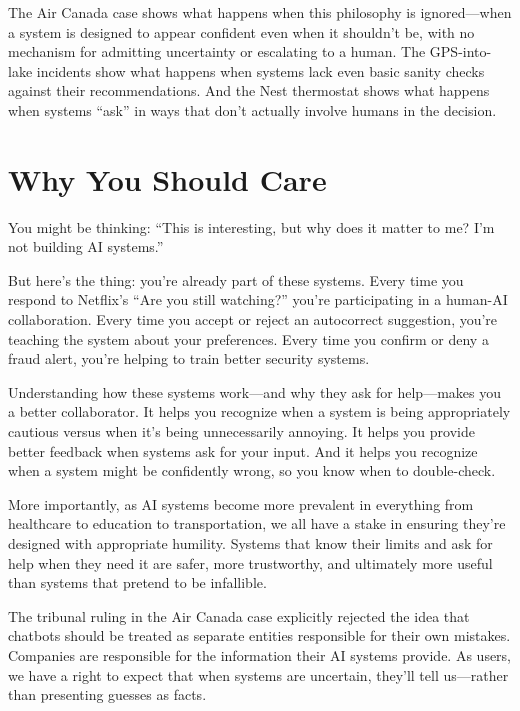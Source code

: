 The Air Canada case shows what happens when this philosophy is ignored---when a system is designed to appear confident even when it shouldn't be, with no mechanism for admitting uncertainty or escalating to a human. The GPS-into-lake incidents show what happens when systems lack even basic sanity checks against their recommendations. And the Nest thermostat shows what happens when systems ``ask'' in ways that don't actually involve humans in the decision.

\section{Why You Should Care}

You might be thinking: ``This is interesting, but why does it matter to me? I'm not building AI systems.''

But here's the thing: you're already part of these systems. Every time you respond to Netflix's ``Are you still watching?'' you're participating in a human-AI collaboration. Every time you accept or reject an autocorrect suggestion, you're teaching the system about your preferences. Every time you confirm or deny a fraud alert, you're helping to train better security systems.

Understanding how these systems work---and why they ask for help---makes you a better collaborator. It helps you recognize when a system is being appropriately cautious versus when it's being unnecessarily annoying. It helps you provide better feedback when systems ask for your input. And it helps you recognize when a system might be confidently wrong, so you know when to double-check.

More importantly, as AI systems become more prevalent in everything from healthcare to education to transportation, we all have a stake in ensuring they're designed with appropriate humility. Systems that know their limits and ask for help when they need it are safer, more trustworthy, and ultimately more useful than systems that pretend to be infallible.

The tribunal ruling in the Air Canada case explicitly rejected the idea that chatbots should be treated as separate entities responsible for their own mistakes. Companies are responsible for the information their AI systems provide. As users, we have a right to expect that when systems are uncertain, they'll tell us---rather than presenting guesses as facts.

